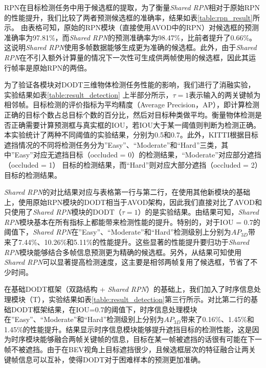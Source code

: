 

RPN在目标检测任务中用于候选框的提取，为了衡量\textit{Shared RPN}相对于原始RPN的性能提升，我们比较了两者预测候选框的准确率，结果如表\ref{table:rpn_result}所示。
由表格可知，原始的RPN模块（直接使用AVOD\cite{ku2018joint}中的RPN）对候选框的预测准确率为97.81\%，而\textit{Shared RPN}的预测准确率为98.47\%，比前者提升了0.66\%。这说明\textit{Shared RPN}使用多帧数据能够生成更为准确的候选框。此外，由于\textit{Shared RPN}在不引入额外计算量的情况下一次性可生成供两帧使用的候选框，因此其运行帧率是原始RPN的两倍。



为了验证各模块对DODT三维物体检测任务性能的影响，我们进行了消融实验，实验结果如表\ref{table:result_detection} 上半部分所示，$\tau = 1$表示输入的两关键帧为相邻帧。目标检测的评价指标为平均精度（Average Precision，AP），即计算检测正确的目标个数占总目标个数的百分比，然后对目标种类做平均。衡量物体检测是否正确需要计算预测框与真实框的IOU，若IOU大于某一阈值则判断为检测正确。本实验统计了两种不同阈值的实验结果，分别为0.5和0.7。此外，KITTI根据目标遮挡情况的不同将检测任务分为”Easy”、“Moderate”和“Hard”三类，其中”Easy”对应无遮挡目标（occluded = 0）的检测结果，“Moderate”对应部分遮挡（occluded = 1） 目标的检测结果，而“Hard”则对应大部分遮挡（occluded = 2） 目标的检测结果。

\textit{Shared RPN}的对比结果对应与表格第一行与第二行，在使用其他新模块的基础上，使用原始RPN模块的DODT相当于AVOD架构，因此我们直接对比了AVOD和只使用了\textit{Shared RPN}模块的DODT（$\tau = 1$）的是实验结果。由结果可知，\textit{Shared RPN}模块基本在所有指标上都能带来检测性能的提升。特别的，对于IOU = 0.7的阈值下，\textit{Shared RPN}在”Easy”、“Moderate”和“Hard”检测级别上分别为$AP_{3D}$带来了7.44\%、10.26\%和5.11\%的性能提升。这些显著的性能提升要归功于\textit{Shared RPN}模块能够结合多帧信息预测更为精确的候选框。另外，从结果可知使用\textit{Shared RPN}可以显著提高检测速度，这主要是相邻两帧复用了候选框，节省了不少时间。

在基础DODT框架（双路结构 + \textit{Shared RPN}）的基础上，我们加入了时序信息处理模块（T），实验结果如表\ref{table:result_detection}第三行所示。对比第二行的基础DODT框架结果，在IOU=0.7的阈值下，时序信息处理模块在”Easy”、“Moderate”和“Hard”检测级别上分别为$AP_{3D}$带来了0.16\%、1.45\%和1.45\%的性能提升。结果显示时序信息模块能够提升遮挡目标的检测性能，这是因为时序模块能够融合两帧关键帧的信息，目标在某一帧被遮挡的话很有可能在下一帧不被遮挡。由于在BEV视角上目标遮挡很少，且候选框层次的特征融合让两关键帧信息可以互补，使得DODT对于困难样本的预测更加准确。

